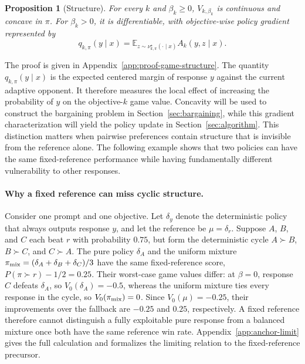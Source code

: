 \documentclass{article}
\newtheorem{proposition}{Proposition}
\theoremstyle{remark}
\theoremstyle{plain}
\newcommand{\E}{\mathbb{E}}
\begin{document}
\begin{proposition}[Structure]
\label{prop:game-structure}
For every $k$ and $\beta_k\ge0$, $V_{k,\beta_k}$ is continuous and
concave in $\pi$. For $\beta_k>0$, it is differentiable, with
objective-wise policy gradient represented by
\begin{equation}
q_{k,\pi}(y\mid x)
=
\E_{z\sim\nu^\star_{k,\pi}(\cdot\mid x)}
A_k(y,z\mid x).
\label{eq:game-gradient}
\end{equation}
\end{proposition}
The proof is given in Appendix~\ref{app:proof-game-structure}. The quantity $q_{k,\pi}(y\mid x)$ is the expected centered margin of
response $y$ against the current adaptive opponent. It therefore measures
the local effect of increasing the probability of $y$ on the objective-$k$
game value. Concavity will be used to construct the bargaining problem in
Section~\ref{sec:bargaining}, while this gradient characterization will
yield the policy update in Section~\ref{sec:algorithm}. This distinction matters when pairwise preferences contain structure that is invisible from the reference alone. The following example shows that two policies can have the same fixed-reference performance while having fundamentally different vulnerability to other responses.

\paragraph{Why a fixed reference can miss cyclic structure.}
Consider one prompt and one objective. Let $\delta_y$ denote the deterministic policy that always outputs response $y$, and let the reference be $\mu=\delta_r$. Suppose $A$, $B$, and $C$ each beat $r$ with probability $0.75$, but form the deterministic cycle $A\succ B$, $B\succ C$, and $C\succ A$. The pure policy $\delta_A$ and the uniform mixture $\pi_{\rm mix}=(\delta_A+\delta_B+\delta_C)/3$ have the same fixed-reference score, $P(\pi\succ r)-1/2=0.25$. Their worst-case game values differ: at $\beta=0$, response $C$ defeats $\delta_A$, so $V_0(\delta_A)=-0.5$, whereas the uniform mixture ties every response in the cycle, so $V_0(\pi_{\rm mix})=0$. Since $V_0(\mu)=-0.25$, their improvements over the fallback are $-0.25$ and $0.25$, respectively. A fixed reference therefore cannot distinguish a fully exploitable pure response from a balanced mixture once both have the same reference win rate. Appendix~\ref{app:anchor-limit} gives the full calculation and formalizes the limiting relation to the fixed-reference precursor.
\end{document}
